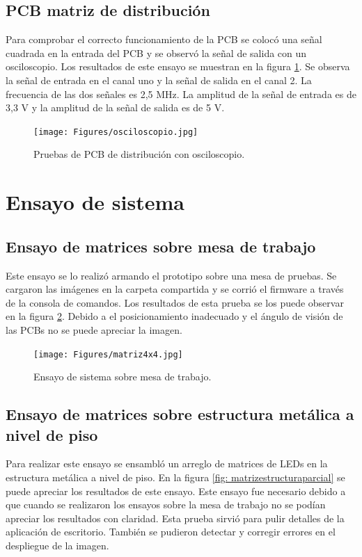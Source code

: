 \subsection{PCB matriz de distribución}
Para comprobar el correcto funcionamiento de la PCB se colocó una señal cuadrada en la entrada del PCB y se observó la señal de salida con un osciloscopio. Los resultados de este ensayo se muestran en la figura \ref{fig: capturaosciloscopio}. Se observa la señal de entrada en el canal uno y la señal de salida en el canal 2. La frecuencia de las dos señales es 2,5 MHz. La amplitud de la señal de entrada es de 3,3 V y la amplitud de la señal de salida es de 5 V. 

\begin{figure}[htpb]
	\centering
	\texttt{[image: Figures/osciloscopio.jpg]} 
	\caption{Pruebas de PCB de distribución con osciloscopio.}
	\label{fig: capturaosciloscopio}
\end{figure}




\section{Ensayo de sistema}
\subsection{Ensayo de matrices sobre mesa de trabajo}
Este ensayo se lo realizó armando el prototipo sobre una mesa de pruebas. Se cargaron las imágenes en la carpeta compartida y se corrió el firmware a través de la consola de comandos. Los resultados de esta prueba se los puede observar en la figura \ref{fig: matriz4x4}. Debido a el posicionamiento inadecuado y el ángulo de visión de las PCBs no se puede apreciar la imagen.

\begin{figure}[htpb]
	\centering
	\texttt{[image: Figures/matriz4x4.jpg]} 
	\caption{Ensayo de sistema sobre mesa de trabajo.}
	\label{fig: matriz4x4}
\end{figure}

\subsection{Ensayo de matrices sobre estructura metálica a nivel de piso}
Para realizar este ensayo se ensambló un arreglo de matrices de LEDs en la estructura metálica a nivel de piso. En la figura \ref{fig: matrizestructuraparcial} se puede apreciar los resultados de este ensayo. Este ensayo fue necesario debido a que cuando se realizaron los ensayos sobre la mesa de trabajo no se podían apreciar los resultados con claridad. Esta prueba sirvió para pulir detalles de la aplicación de escritorio. También se pudieron detectar y corregir errores en el despliegue de la imagen.

